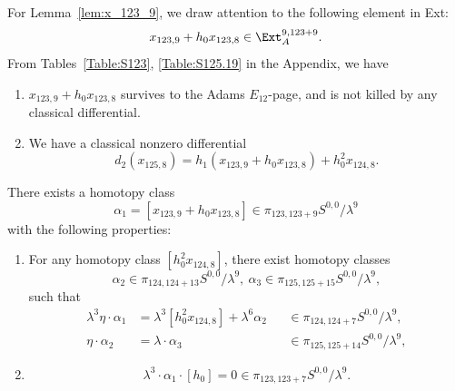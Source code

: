 \documentclass{amsart}
\numberwithin{equation}{section}
\begin{document}
For Lemma~\ref{lem:x_123_9}, we draw attention to the following element in Ext:
$$x_{123,9}+h_0x_{123,8} \in \Ext_A^{9, 123+9}.$$
From Tables~\ref{Table:S123}, \ref{Table:S125.19} in the Appendix, we have
\begin{fact} \label{fact:x_123_9}\label{fact:x1239}
    \begin{enumerate}

   \item  $x_{123,9}+h_0x_{123,8}$ survives to the Adams $E_{12}$-page, and is not killed by any classical differential.
    \item We have a classical nonzero differential 
    $$d_2 (x_{125,8}) = h_1 (x_{123,9}+h_0x_{123,8}) + h_0^2x_{124,8}.$$
   \end{enumerate}
\end{fact}

\begin{lemma} \label{lem:x_123_9}\label{lem:x1239}
    There exists a homotopy class 
    $$\alpha_1 = [x_{123,9}+h_0x_{123,8}] \in \pi_{123,123+9} S^{0,0}/\lambda^9$$
    with the following properties:
    \begin{enumerate}
    \item For any homotopy class $[h_0^2 x_{124,8}]$, there exist homotopy classes 
    $$\alpha_2 \in \pi_{124,124+13} S^{0,0}/\lambda^9, \ \alpha_3 \in \pi_{125,125+15} S^{0,0}/\lambda^9,$$ 
    such that 
    \begin{align*}
        \lambda^3 \eta \cdot \alpha_1 & = \lambda^3 [h_0^2 x_{124,8}] + 
\lambda^6 \alpha_2 && \in \pi_{124,124+7} S^{0,0}/\lambda^9,\\
\eta \cdot \alpha_2 & = \lambda \cdot \alpha_3 && \in \pi_{125,125+14} S^{0,0}/\lambda^9,
    \end{align*}
\item \leavevmode\vspace*{-\dimexpr\abovedisplayskip + \baselineskip} 
$$\lambda^3 \cdot \alpha_1 \cdot [h_0] = 0 \in \pi_{123,123+7} S^{0,0}/\lambda^9.$$
    \end{enumerate}
\end{lemma}
\end{document}
